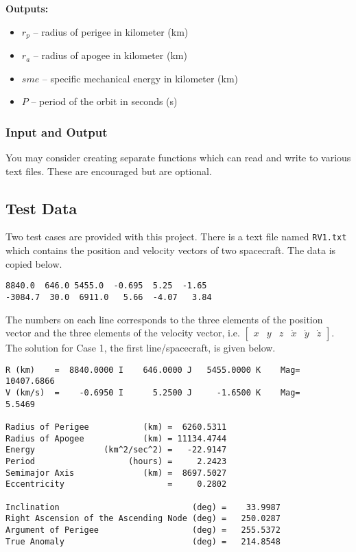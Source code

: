 \documentclass[11pt, reqno]{article}    %
\begin{document}
\noindent \textbf{Outputs:}
\begin{itemize}
    \item \( r_p \) -- radius of perigee in kilometer (\si{\kilo\meter})
    \item \( r_a \) -- radius of apogee in kilometer (\si{\kilo\meter})
    \item \( sme \) -- specific mechanical energy in kilometer (\si{\kilo\meter})
    \item \( P \) -- period of the orbit in seconds (\si{\second})
\end{itemize}

\subsubsection*{Input and Output}

You may consider creating separate functions which can read and write to various text files. 
These are encouraged but are optional.

\subsection*{Test Data}
Two test cases are provided with this project. 
There is a text file named \texttt{RV1.txt} which contains the position and velocity vectors of two spacecraft. 
The data is copied below.
\begin{verbatim}
8840.0  646.0 5455.0  -0.695  5.25  -1.65
-3084.7  30.0  6911.0   5.66  -4.07   3.84 
\end{verbatim}
The numbers on each line corresponds to the three elements of the position vector and the three elements of the velocity vector, i.e. \(\begin{bmatrix} x & y & z & \dot{x} & \dot{y} & \dot{z} \end{bmatrix}\).
The solution for Case 1, the first line/spacecraft, is given below.
\begin{verbatim}
R (km)    =  8840.0000 I    646.0000 J   5455.0000 K    Mag= 10407.6866
V (km/s)  =    -0.6950 I      5.2500 J     -1.6500 K    Mag=     5.5469

Radius of Perigee           (km) =  6260.5311
Radius of Apogee            (km) = 11134.4744
Energy              (km^2/sec^2) =   -22.9147
Period                   (hours) =     2.2423
Semimajor Axis              (km) =  8697.5027
Eccentricity                     =     0.2802

Inclination                           (deg) =    33.9987
Right Ascension of the Ascending Node (deg) =   250.0287
Argument of Perigee                   (deg) =   255.5372
True Anomaly                          (deg) =   214.8548
\end{verbatim}
\end{document}
